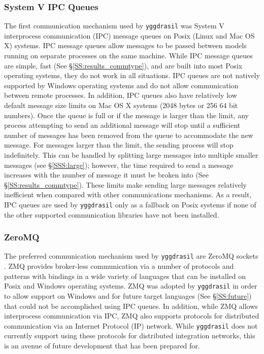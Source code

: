 \documentclass[journal]{IEEEtran}
\newcommand{\pkg}{{\tt yggdrasil}{}}
\begin{document}
\subsubsection{System V IPC Queues}\label{SSS:ipc}
%
The first communication mechanism used by {\pkg} was System V interprocess communication (IPC) message queues \citep{Rusling1999} on Posix (Linux and Mac OS X) systems. IPC message queues allow messages to be passed between models running on separate processes on the same machine. While IPC message queues are simple, fast (See \S\ref{SS:results_commtype}), and are built into most Posix operating systems, they do not work in all situations. IPC queues are not natively supported by Windows operating systems and do not allow communication between remote processes. In addition, IPC queues also have relatively low default message size limits on Mac OS X systems (2048 bytes or 256 64 bit numbers). Once the queue is full or if the message is larger than the limit, any process attempting to send an additional message will stop until a sufficient number of messages has been removed from the queue to accommodate the new message. For messages larger than the limit, the sending process will stop indefinitely. This can be handled by splitting large messages into multiple smaller messages (see \S\ref{SSS:large}); however, the time required to send a message increases with the number of message it must be broken into (See \S\ref{SS:results_commtype}). These limits make sending large messages relatively inefficient when compared with other communications mechanisms. As a result, IPC queues are used by {\pkg} only as a fallback on Posix systems if none of the other supported communication libraries have not been installed.

\subsubsection{ZeroMQ}\label{SSS:zmq}
%
The preferred communication mechanism used by {\pkg} are ZeroMQ sockets \citep[ZMQ][]{Akgul2013}. ZMQ provides broker-less communication via a number of protocols and patterns with bindings in a wide variety of languages that can be installed on Posix and Windows operating systems. ZMQ was adopted by {\pkg} in order to allow support on Windows and for future target languages (See \S\ref{SS:future}) that could not be accomplished using IPC queues. In addition, while ZMQ allows interprocess communication via IPC, ZMQ also supports protocols for distributed communication via an Internet Protocol (IP) network. While {\pkg} does not currently support using these protocols for distributed integration networks, this is an avenue of future development that has been prepared for.
\end{document}
